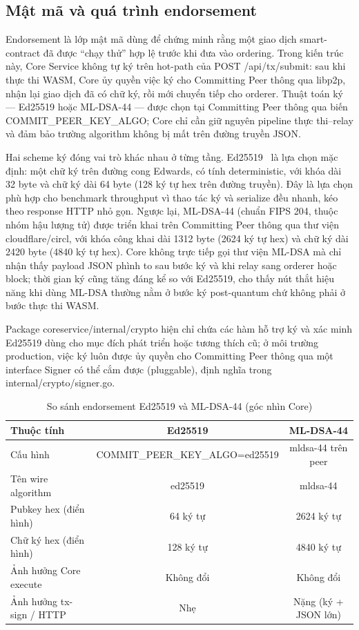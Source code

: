 \subsection{Mật mã và quá trình endorsement}
\label{sec:core-crypto}

Endorsement là lớp mật mã dùng để chứng minh rằng một giao dịch smart-contract
đã được ``chạy thử'' hợp lệ trước khi đưa vào ordering. Trong kiến trúc này,
Core Service không tự ký trên hot-path của POST /api/tx/submit: sau
khi thực thi WASM, Core ủy quyền việc ký cho Committing Peer thông qua libp2p,
nhận lại giao dịch đã có chữ ký, rồi mới chuyển tiếp cho orderer. Thuật toán ký
--- Ed25519 hoặc ML-DSA-44 --- được chọn tại Committing Peer thông qua biến
COMMIT\_PEER\_KEY\_ALGO; Core chỉ cần giữ nguyên pipeline
thực thi--relay và đảm bảo trường algorithm không bị mất trên đường
truyền JSON.

Hai scheme ký đóng vai trò khác nhau ở từng tầng. Ed25519~\cite{bernstein2012ed25519,rfc8032}
là lựa chọn mặc định: một chữ ký trên đường cong Edwards, có tính
deterministic, với khóa dài 32 byte và chữ ký dài 64 byte (128 ký tự hex trên
đường truyền). Đây là lựa chọn phù hợp cho benchmark throughput vì thao tác ký
và serialize đều nhanh, kéo theo response HTTP nhỏ gọn. Ngược lại, ML-DSA-44
(chuẩn FIPS 204, thuộc nhóm hậu lượng tử) được triển khai trên Committing Peer
thông qua thư viện cloudflare/circl, với khóa công khai dài 1312 byte
(2624 ký tự hex) và chữ ký dài 2420 byte (4840 ký tự hex). Core không trực tiếp
gọi thư viện ML-DSA mà chỉ nhận thấy payload JSON phình to sau bước ký và khi
relay sang orderer hoặc block; thời gian ký cũng tăng đáng kể so với Ed25519,
cho thấy nút thắt hiệu năng khi dùng ML-DSA thường nằm ở bước ký post-quantum
chứ không phải ở bước thực thi WASM.

Package coreservice/internal/crypto hiện chỉ chứa các hàm hỗ trợ ký và
xác minh Ed25519 dùng cho mục đích phát triển hoặc tương thích cũ; ở môi trường
production, việc ký luôn được ủy quyền cho Committing Peer thông qua một
interface Signer có thể cắm được (pluggable), định nghĩa trong
internal/crypto/signer.go.

\begin{table}[H]
\centering
\caption{So sánh endorsement Ed25519 và ML-DSA-44 (góc nhìn Core)}
\label{tab:core-algo-compare}
\begin{tabular}{@{}lcc@{}}
\toprule
Thuộc tính & Ed25519 & ML-DSA-44 \\
\midrule
Cấu hình & COMMIT\_PEER\_KEY\_ALGO=ed25519 & mldsa-44 trên peer \\
Tên wire algorithm & ed25519 & mldsa-44 \\
Pubkey hex (điển hình) & 64 ký tự & 2624 ký tự \\
Chữ ký hex (điển hình) & 128 ký tự & 4840 ký tự \\
Ảnh hưởng Core execute & Không đổi & Không đổi \\
Ảnh hưởng tx-sign / HTTP & Nhẹ & Nặng (ký + JSON lớn) \\
\bottomrule
\end{tabular}
\end{table}

